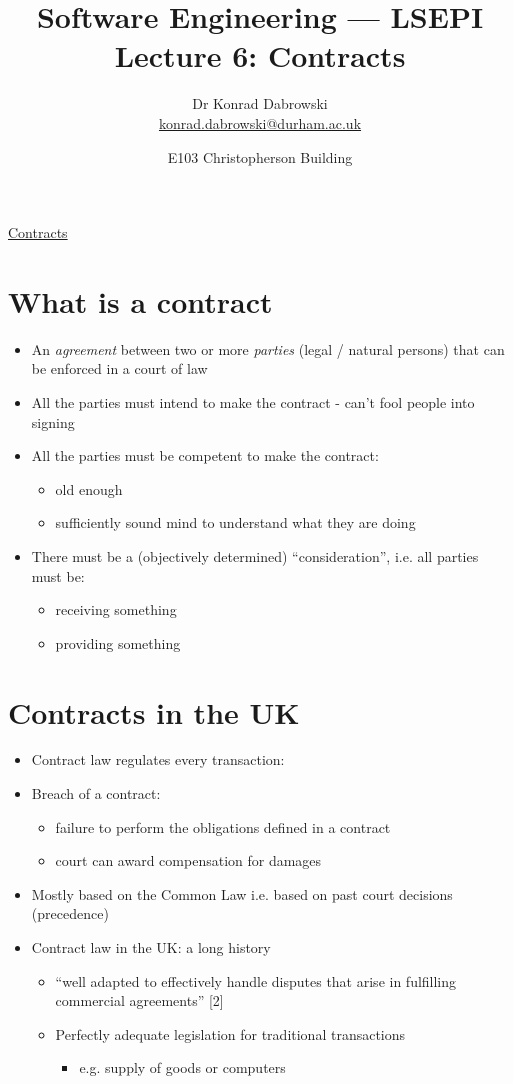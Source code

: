 \documentclass{article}
\title{Software Engineering --- LSEPI Lecture 6: Contracts}
\author{Dr Konrad Dabrowski\\
\href{mailto://konrad.dabrowski@durham.ac.uk}{konrad.dabrowski@durham.ac.uk}
}
\date{E103 Christopherson Building}
\begin{document}
\begin{center}
	\underline{\huge Contracts}
\end{center}


\section{What is a contract}
\begin{itemize}
\item An \emph{agreement} between two or more \emph{parties} (legal / natural persons) that can be enforced in a court of law
\item All the parties must intend to make the contract - can't fool people into signing
\item All the parties must be competent to make the contract:
\begin{itemize}
\item old enough
\item sufficiently sound mind to understand what they are doing
\end{itemize}
\item There must be a (objectively determined) ``consideration'', i.e. all parties must be:
\begin{itemize}
\item receiving something
\item providing something
\end{itemize}
\end{itemize}



\section{Contracts in the UK}
\begin{itemize}
\item Contract law regulates every transaction:
\item Breach of a contract:
\begin{itemize}
\item failure to perform the obligations defined in a contract
\item court can award compensation for damages
\end{itemize}
\end{itemize}
\begin{itemize}
\item Mostly based on the Common Law i.e. based on past court decisions (precedence)
\item Contract law in the UK: a long history
\begin{itemize}
\item ``well adapted to effectively handle disputes that arise in fulfilling commercial agreements'' [2]
\item Perfectly adequate legislation for traditional transactions
\begin{itemize}
\item e.g. supply of goods or computers
\end{itemize}
\end{itemize}
\end{itemize}
\end{document}
